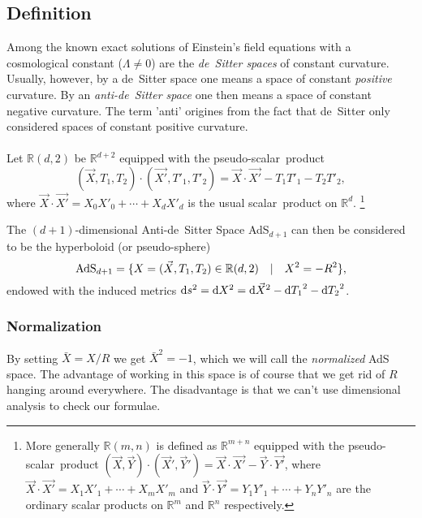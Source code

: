 \subsection{Definition}

Among the known exact solutions of Einstein's field equations with a cosmological constant ($\Lambda\ne 0$) are the {\em de~Sitter spaces} of constant curvature. Usually, however, by a de~Sitter space one means a space of constant {\em positive} curvature. By an {\em anti-de~Sitter space} one then means a space of constant negative curvature. The term 'anti' origines from the fact that de~Sitter only considered spaces of constant positive curvature.
\\\\
Let $\mathbb{R}(d,2)$ be $\mathbb{R}^{d+2}$ equipped with the pseudo-scalar~product
$$(\vec{X},T_1,T_2) \cdot (\vec{X'},T'_1,T'_2) = \vec{X}\cdot\vec{X'} - T_1 T'_1 - T_2 T'_2,$$
where $\vec{X}\cdot\vec{X'} = X_0 X'_0 + \cdots + X_d X'_d$ is the usual scalar~product on $\mathbb{R}^d$.
\footnote{More generally $\mathbb{R}(m,n)$ is defined as $\mathbb{R}^{m+n}$ equipped with the pseudo-scalar~product $(\vec{X},\vec{Y})\cdot(\vec{X}',\vec{Y}')=\vec{X}\cdot\vec{X'}-\vec{Y}\cdot\vec{Y'}$, where $\vec{X}\cdot\vec{X'}=X_1 X'_1+\cdots+X_m X'_m$ and $\vec{Y}\cdot\vec{Y'}=Y_1 Y'_1+\cdots+Y_n Y'_n$ are the ordinary scalar products on $\mathbb{R}^m$ and $\mathbb{R}^n$ respectively.}

The $(d+1)$-dimensional Anti-de~Sitter Space AdS$_{d+1}$ can then be considered to be the hyperboloid (or pseudo-sphere)
\begin{equation}\label{eq:adsdef}\mathrm{AdS}_{d+1}=\{X=(\vec{X},T_1,T_2)\in\mathbb{R}(d,2) \quad |\quad X^2=-R^2\},\end{equation}
endowed with the induced metrics $\mathrm{d} s^2=\mathrm{d} X^2=\mathrm{d}\vec{X}^2-{\mathrm{d} T_1}^2-{\mathrm{d} T_2}^2$.

\subsubsection{Normalization}
By setting $\bar{X}=X/R$ we get $\bar{X}^2=-1$, which we will call the {\em normalized} AdS space. The advantage of working in this space is of course that we get rid of $R$ hanging around everywhere. The disadvantage is that we can't use dimensional analysis to check our formulae.

